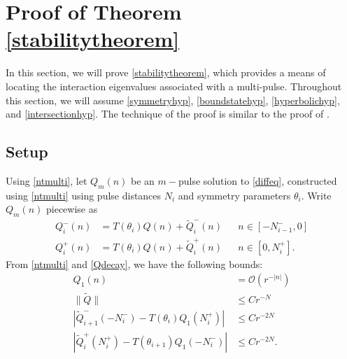 \documentclass[12pt]{elsarticle}
\begin{document}
\section{Proof of Theorem \ref{stabilitytheorem}}

In this section, we will prove \cref{stabilitytheorem}, which provides a means of locating the interaction eigenvalues associated with a multi-pulse. Throughout this section, we will assume \cref{symmetryhyp}, \cref{boundstatehyp}, \cref{hyperbolichyp}, and \cref{intersectionhyp}. The technique of the proof is similar to the proof of \cite[Theorem 2]{Sandstede1998}.

\subsection{Setup}

Using \cref{ntmulti}, let $Q_m(n)$ be an $m-$pulse solution to \cref{diffeq}, constructed using \cref{ntmulti} using pulse distances $N_i$ and symmetry parameters $\theta_i$. Write $Q_m(n)$ piecewise as
\begin{equation}\label{Qmpiecewise}
\begin{aligned}
Q_i^-(n) &= T(\theta_i) Q(n) + \tilde{Q}_i^-(n) && n \in [-N_{i-1}^-, 0] \\
Q_i^+(n) &= T(\theta_i) Q(n) + \tilde{Q}_i^+(n) && n \in [0, N_i^+].
\end{aligned}
\end{equation}
From \cref{ntmulti} and \cref{Qdecay}, we have the following bounds:
\begin{equation}\label{stabbounds1}
\begin{aligned}
Q_1(n) &= \mathcal{O}(r^{-|n|}) \\
\|\tilde{Q}\| &\leq C r^{-N} \\
|\tilde{Q}_{i+1}^-(-N_i^-) - T(\theta_i) Q_1(N_i^+)| &\leq C r^{-2N} \\
|\tilde{Q}_i^+(N_i^+) - T(\theta_{i+1}) Q_1(-N_i^-)| &\leq C r^{-2N}.
\end{aligned}
\end{equation}
\end{document}
